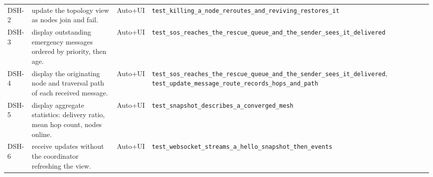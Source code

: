 \begin{longtable}{@{}p{0.95cm}p{6.6cm}p{1.15cm}p{8.6cm}@{}}
DSH-2 & update the topology view as nodes join and fail. & Auto+UI & \texttt{test\_\allowbreak{}killing\_\allowbreak{}a\_\allowbreak{}node\_\allowbreak{}reroutes\_\allowbreak{}and\_\allowbreak{}reviving\_\allowbreak{}restores\_\allowbreak{}it} \\
DSH-3 & display outstanding emergency messages ordered by priority, then age. & Auto+UI & \texttt{test\_\allowbreak{}sos\_\allowbreak{}reaches\_\allowbreak{}the\_\allowbreak{}rescue\_\allowbreak{}queue\_\allowbreak{}and\_\allowbreak{}the\_\allowbreak{}sender\_\allowbreak{}sees\_\allowbreak{}it\_\allowbreak{}delivered} \\
DSH-4 & display the originating node and traversal path of each received message. & Auto+UI & \texttt{test\_\allowbreak{}sos\_\allowbreak{}reaches\_\allowbreak{}the\_\allowbreak{}rescue\_\allowbreak{}queue\_\allowbreak{}and\_\allowbreak{}the\_\allowbreak{}sender\_\allowbreak{}sees\_\allowbreak{}it\_\allowbreak{}delivered}, \texttt{test\_\allowbreak{}update\_\allowbreak{}message\_\allowbreak{}route\_\allowbreak{}records\_\allowbreak{}hops\_\allowbreak{}and\_\allowbreak{}path} \\
DSH-5 & display aggregate statistics: delivery ratio, mean hop count, nodes online. & Auto+UI & \texttt{test\_\allowbreak{}snapshot\_\allowbreak{}describes\_\allowbreak{}a\_\allowbreak{}converged\_\allowbreak{}mesh} \\
DSH-6 & receive updates without the coordinator refreshing the view. & Auto+UI & \texttt{test\_\allowbreak{}websocket\_\allowbreak{}streams\_\allowbreak{}a\_\allowbreak{}hello\_\allowbreak{}snapshot\_\allowbreak{}then\_\allowbreak{}events} \\
\bottomrule
\end{longtable}
\endgroup
